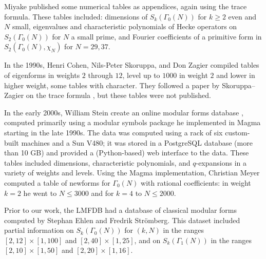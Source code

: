 \documentclass[11pt]{amsart}
\numberwithin{equation}{subsection}
\theoremstyle{plain}
\theoremstyle{definition}
\newcommand{\jv}[1]{{\color{red} \textsf{[[JV: #1]]}}}
\begin{document}
Miyake \cite{Miyake} published some numerical tables as appendices, again using the trace formula.  These tables included: dimensions of $S_k(\Gamma_0(N))$ for $k \geq 2$ even and $N$ small, eigenvalues and characteristic polynomials of Hecke operators on $S_2(\Gamma_0(N))$ for $N$ a small prime, and Fourier coefficients of a primitive form in $S_2(\Gamma_0(N),\chi_N)$ for $N=29,37$.

In the 1990s, Henri Cohen, Nils-Peter Skoruppa, and Don Zagier compiled tables of eigenforms in weights $2$ through $12$, level up to $1000$ in weight $2$ and lower in higher weight, some tables with character.  They followed a paper by Skoruppa--Zagier on the trace formula \cite{SkoruppaZagier}, but these tables were not published.  

In the early 2000s, William Stein create an online modular forms database \cite{Stein:Tables}, computed primarily using a modular symbols package \cite{Stein} he implemented in \textsf{Magma} \cite{Magma} starting in the late 1990s.  The data was computed using a rack of six custom-built machines and a Sun V480; it was stored in a PostgreSQL database (more than 10 GB) and provided a (Python-based) web interface to the data.  These tables included dimensions, characteristic polynomials, and $q$-expansions in a variety of weights and levels.  Using the Magma implementation, Christian Meyer \cite{Meyer1,Meyer2} computed a table of newforms for $\Gamma_0(N)$ with rational coefficients: in weight $k=2$ he went to $N \leq 3000$ and for $k=4$ to $N \leq 2000$.

Prior to our work, the LMFDB had a database of classical modular forms computed by Stephan Ehlen and Fredrik Str\"omberg.  This dataset included partial information on $S_k(\Gamma_0(N))$ for $(k,N)$ in the ranges $[2,12] \times [1,100]$ and $[2,40] \times [1,25]$, and on $S_k(\Gamma_1(N))$ in the ranges $[2,10] \times [1,50]$ and $[2,20] \times [1,16]$.  
\end{document}
